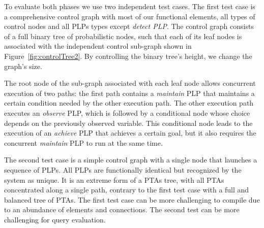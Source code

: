 \documentclass[letterpaper]{article}
\newcommand{\frameImage}[4]{
\begin{figure}[H] 
  \centerline{
    \fcolorbox{frameColor}{white}{
        \texttt{[image: \#1]} } }
    \caption{#4}
    \label{fig:#1}
\end{figure}
}
\begin{document}
To evaluate 
both phases we use two independent test cases.
The first test case is a comprehensive control graph
with most of our functional elements, all types of control nodes and all PLPs types except {\em detect PLP}. The control graph 
consists of a full binary tree of probabilistic nodes, such that
each of its leaf nodes 
is associated with the independent control sub-graph shown in Figure~\ref{fig:controlTree2}. 
By controlling the binary tree's height,
we  change the graph's size.


The root node of the sub-graph associated with each leaf node
allows concurrent execution of two paths: the first path contains a {\em maintain} PLP that maintains a certain condition needed by the other execution path. The other execution path
executes an {\em observe} PLP, which is followed by a conditional node whose choice depends
on the previously observed variable. This conditional node leads to the execution of an {\em achieve} PLP that achieves a certain goal, but it also requires the concurrent {\em maintain} PLP to run at the same time. 

The second test case  is a  simple control graph with a single node that launches a sequence of PLPs. All PLPs are functionally identical but recognized by the system as unique. 
It is an extreme form of a PTAs tree, with all PTAs concentrated along a single path, contrary to the first test case with a full and balanced tree of PTAs. The first test case can be more challenging to compile due to an abundance of elements and connections. The second test can be more challenging for query evaluation. 
\end{document}
